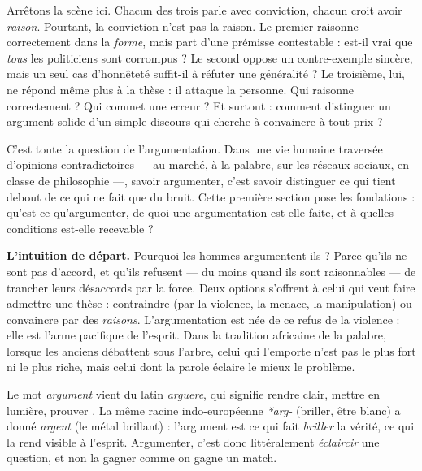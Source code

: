 \documentclass[11pt]{article}
\newcommand{\cle}[1]{{\popxbold\color{popdark}#1}}
\newcounter{popsec}
\newcounter{popsub}
\newcommand{\courssub}[1]{%
  \stepcounter{popsub}%
  \par\vspace{9pt}\noindent{\popxbold\fontsize{11.5}{13}\selectfont\color{popink}{\color{poporange}\thepopsec.\thepopsub}\hspace{6pt}#1}\par\nopagebreak\vspace{4pt}
}
\begin{document}
Arrêtons la scène ici. Chacun des trois parle avec conviction, chacun croit avoir \emph{raison}. Pourtant, la conviction n'est pas la raison. Le premier raisonne correctement dans la \emph{forme}, mais part d'une prémisse contestable : est-il vrai que \emph{tous} les politiciens sont corrompus ? Le second oppose un contre-exemple sincère, mais un seul cas d'honnêteté suffit-il à réfuter une généralité ? Le troisième, lui, ne répond même plus à la thèse : il attaque la personne. Qui raisonne correctement ? Qui commet une erreur ? Et surtout : comment distinguer un argument solide d'un simple discours qui cherche à convaincre à tout prix ?

C'est toute la question de l'\cle{argumentation}. Dans une vie humaine traversée d'opinions contradictoires — au marché, à la palabre, sur les réseaux sociaux, en classe de philosophie —, savoir argumenter, c'est savoir distinguer ce qui tient debout de ce qui ne fait que du bruit. Cette première section pose les fondations : qu'est-ce qu'argumenter, de quoi une argumentation est-elle faite, et à quelles conditions est-elle recevable ?

\courssub{Qu'est-ce qu'argumenter ?}

\textbf{L'intuition de départ.} Pourquoi les hommes argumentent-ils ? Parce qu'ils ne sont pas d'accord, et qu'ils refusent — du moins quand ils sont raisonnables — de trancher leurs désaccords par la force. Deux options s'offrent à celui qui veut faire admettre une thèse : contraindre (par la violence, la menace, la manipulation) ou convaincre par des \emph{raisons}. L'argumentation est née de ce refus de la violence : elle est l'arme pacifique de l'esprit. Dans la tradition africaine de la palabre, lorsque les anciens débattent sous l'arbre, celui qui l'emporte n'est pas le plus fort ni le plus riche, mais celui dont la parole éclaire le mieux le problème.

\begin{savaistu}
Le mot \emph{argument} vient du latin \emph{arguere}, qui signifie \guillemotleft rendre clair, mettre en lumière, prouver \guillemotright. La même racine indo-européenne \emph{*arg-} (briller, être blanc) a donné \emph{argent} (le métal brillant) : l'argument est ce qui fait \emph{briller} la vérité, ce qui la rend visible à l'esprit. Argumenter, c'est donc littéralement \emph{éclaircir} une question, et non la gagner comme on gagne un match.
\end{savaistu}
\end{document}
